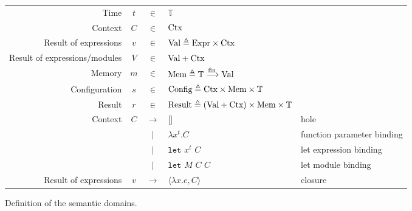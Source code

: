 \documentclass[acmsmall,screen]{acmart}
\theoremstyle{definition}
\newcommand*{\vbar}{|}
\newcommand*{\Expr}{\text{Expr}}
\newcommand*{\Time}{\mathbb{T}}
\newcommand*{\Ctx}[1]{\text{Ctx}\vphantom{#1}}
\newcommand*{\Value}[1]{\text{Val}\vphantom{#1}}
\newcommand*{\Mem}[1]{\text{Mem}\vphantom{#1}}
\newcommand*{\mem}{m}
\newcommand*{\Config}[1]{\text{Config}\vphantom{#1}}
\newcommand*{\Result}[1]{\text{Result}\vphantom{#1}}
\newcommand*{\fin}[2]{{#1}\xrightarrow{\text{fin}}{#2}}
\newcommand*{\Let}{\mathtt{let}}
\begin{document}
\begin{figure}[htb]
  \centering
  \footnotesize
  \begin{tabular}{rccll}
    Time                          & $t$    & $\in$         & $\Time$                                                                                                          \\
    Context                       & $C$    & $\in$         & $\Ctx\Time$                                                                                                      \\
    Result of expressions         & $v$    & $\in$         & $\Value\Time \triangleq \Expr\times\Ctx\Time$                                                                    \\
    Result of expressions/modules & $V$    & $\in$         & $\Value{\Time}+\Ctx{\Time}$                                                                                      \\
    Memory                        & $\mem$ & $\in$         & $\Mem{\Time} \triangleq \fin{\Time}{\Value{\Time}}$                                                              \\
    Configuration                 & $s$    & $\in$         & $\Config{\Time} \triangleq \Ctx{\Time}\times\Mem{\Time}\times\Time$                                              \\
    Result                        & $r$    & $\in$         & $\Result{\Time} \triangleq (\Value{\Time}+\Ctx{\Time})\times\Mem{\Time}\times\Time$                              \\
    Context                       & $C$    & $\rightarrow$ & []                                                                                  & hole                       \\
                                  &        & $\vbar$       & $\lambda x^{t}.C$                                                                   & function parameter binding \\
                                  &        & $\vbar$       & $\Let$ $x^{t}$ $C$                                                                  & let expression binding     \\
                                  &        & $\vbar$       & $\Let$ $M$ $C$ $C$                                                                  & let module binding         \\
    Result of expressions         & $v$    & $\rightarrow$ & $\langle \lambda x.e, C \rangle$                                                    & closure
  \end{tabular}
  \caption{Definition of the semantic domains.}
\end{figure}
\end{document}
